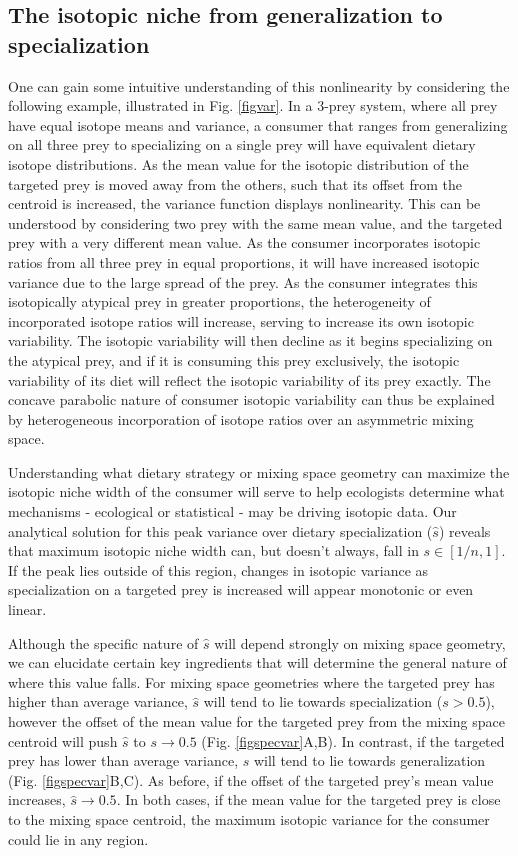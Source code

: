 \documentclass{frontiersSCNS}
\begin{document}
\subsection{The isotopic niche from generalization to specialization}
One can gain some intuitive understanding of this nonlinearity by considering the following example, illustrated in Fig. \ref{figvar}.
In a 3-prey system, where all prey have equal isotope means and variance, a consumer that ranges from generalizing on all three prey to specializing on a single prey will have equivalent dietary isotope distributions.
As the mean value for the isotopic distribution of the targeted prey is moved away from the others, such that its offset from the centroid is increased, the variance function displays nonlinearity.
This can be understood by considering two prey with the same mean value, and the targeted prey with a very different mean value.
As the consumer incorporates isotopic ratios from all three prey in equal proportions, it will have increased isotopic variance due to the large spread of the prey.
As the consumer integrates this isotopically atypical prey in greater proportions, the heterogeneity of incorporated isotope ratios will increase, serving to increase its own isotopic variability.
The isotopic variability will then decline as it begins specializing on the atypical prey, and if it is consuming this prey exclusively, the isotopic variability of its diet will reflect the isotopic variability of its prey exactly.
The concave parabolic nature of consumer isotopic variability can thus be explained by heterogeneous incorporation of isotope ratios over an asymmetric mixing space.


Understanding what dietary strategy or mixing space geometry can maximize the isotopic niche width of the consumer will serve to help ecologists determine what mechanisms - ecological or statistical - may be driving isotopic data.
Our analytical solution for this peak variance over dietary specialization ($\hat s$) reveals that maximum isotopic niche width can, but doesn't always, fall in $s \in [1/n,1]$.
If the peak lies outside of this region, changes in isotopic variance as specialization on a targeted prey is increased will appear monotonic or even linear.

Although the specific nature of $\hat s$ will depend strongly on mixing space geometry, we can elucidate certain key ingredients that will determine the general nature of where this value falls.
For mixing space geometries where the targeted prey has higher than average variance, $\hat s$ will tend to lie towards specialization ($s>0.5$), however the offset of the mean value for the targeted prey from the mixing space centroid will push $\hat s$ to $s \to 0.5$ (Fig. \ref{figspecvar}A,B).
In contrast, if the targeted prey has lower than average variance, $\hat s$ will tend to lie towards generalization (Fig. \ref{figspecvar}B,C).
As before, if the offset of the targeted prey's mean value increases, $\hat s \to 0.5$.
In both cases, if the mean value for the targeted prey is close to the mixing space centroid, the maximum isotopic variance for the consumer could lie in any region.
\end{document}
